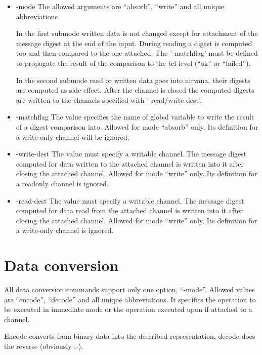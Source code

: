 \documentclass {report}
\begin{document}
\begin {itemize}
\item[-mode]	The allowed arguments are ``absorb'', ``write'' and
		all unique abbreviations.

		In the first submode written data is not changed
		except for attachment of the message digest at the
		end of the input. During reading a digest is computed
		too and then compared to the one attached. The
		'-matchflag' must be defined to propagate the result
		of the comparison to the tcl-level (``ok'' or ``failed'').

		In the second submode read or written data goes into
		nirvana, their digests are computed as
		side effect. After the channel is closed the computed
		digests are written to the channels specified with
		'-read/write-dest'.

\item[-matchflag]	The value specifies the name of global
			variable to write the result of a digest
			comparison into. Allowed for mode ``absorb''
			only. Its definition for a write-only channel
			will be ignored.

\item[-write-dest]	The value must specify a writable channel. The
			message digest computed for data written to
			the attached channel is written into it after
			closing the attached channel. Allowed for mode
			``write'' only. Its definition for a readonly
			channel is ignored.

\item[-read-dest]	The value must specify a writable channel. The
			message digest computed for data read from
			the attached channel is written into it after
			closing the attached channel. Allowed for mode
			``write'' only. Its definition for a write-only
			channel is ignored.
\end   {itemize}


\section {Data conversion}

All data conversion commands support only one option,
``-mode''. Allowed values are ``encode'', ``decode'' and all unique
abbreviations. It specifies the operation to be executed in immediate
mode or the operation executed upon  if attached to a
channel.

Encode converts from binary data into the described representation,
decode does the reverse (obviously :-).
\end{document}
